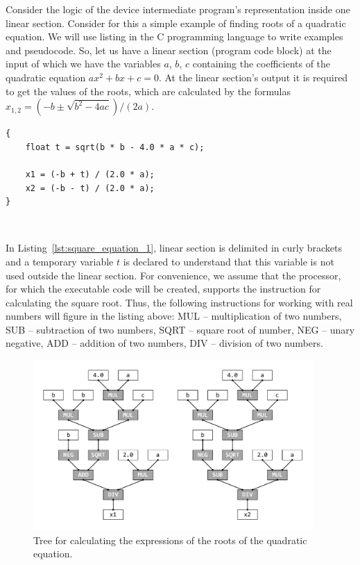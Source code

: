 \documentclass[
11pt,%
tightenlines,%
twoside,%
onecolumn,%
nofloats,%
nobibnotes,%
nofootinbib,%
superscriptaddress,%
noshowpacs,%
centertags]%
{revtex4}
\begin{document}
Consider the logic of the device intermediate program’s representation inside one linear section. Consider for this a simple example of finding roots of a quadratic equation. We will use listing in the C programming language to write examples and pseudocode. So, let us have a linear section (program code block) at the input of which we have the variables $a$, $b$, $c$ containing the coefficients of the quadratic equation $ax^2 + bx + c = 0$. At the linear section’s output it is required to get the values of the roots, which are calculated by the formulas $x_{1,2} = (-b \pm \sqrt{b^2 - 4ac})/(2a)$.

\begin{lstlisting}[caption={The code block for calculating the roots of the quadratic equation.},label={lst:square_equation_1}]
{
    float t = sqrt(b * b - 4.0 * a * c);
    
    x1 = (-b + t) / (2.0 * a);
    x2 = (-b - t) / (2.0 * a);
}
\end{lstlisting}

\

In Listing~\ref{lst:square_equation_1}, linear section is delimited in curly brackets and a temporary variable $t$ is declared to understand that this variable is not used outside the linear section. For convenience, we assume that the processor, for which the executable code will be created, supports the instruction for calculating the square root. Thus, the following instructions for working with real numbers will figure in the listing above: MUL -- multiplication of two numbers, SUB -- subtraction of two numbers, SQRT -- square root of number, NEG -- unary negative, ADD -- addition of two numbers, DIV -- division of two numbers.

\begin{figure}[h]
\setcaptionmargin{5mm}
\includegraphics[width=0.95\textwidth]{pics/square_equation_calculation_tree.pdf}
\caption{Tree for calculating the expressions of the roots of the quadratic equation.}\label{fig:square_equation_calculation_tree}
\end{figure}
\end{document}
